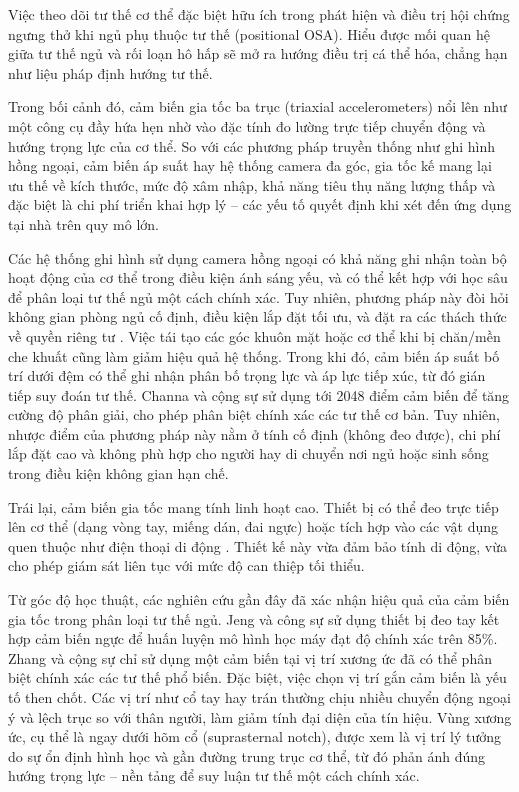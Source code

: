 Việc theo dõi tư thế cơ thể đặc biệt hữu ích trong phát hiện 
và điều trị hội chứng ngưng thở khi ngủ phụ thuộc tư thế (positional OSA).
Hiểu được mối quan hệ giữa tư thế ngủ và rối loạn hô hấp sẽ mở ra hướng điều trị cá thể hóa, 
chẳng hạn như liệu pháp định hướng tư thế. 

Trong bối cảnh đó, cảm biến gia tốc ba trục (triaxial accelerometers) 
nổi lên như một công cụ đầy hứa hẹn nhờ vào đặc tính đo lường trực tiếp 
chuyển động và hướng trọng lực của cơ thể. So với các phương pháp truyền 
thống như ghi hình hồng ngoại, cảm biến áp suất hay hệ thống camera 
đa góc, gia tốc kế mang lại ưu thế về kích thước, mức độ xâm nhập, 
khả năng tiêu thụ năng lượng thấp và đặc biệt là chi phí triển khai 
hợp lý – các yếu tố quyết định khi xét đến ứng dụng tại nhà trên 
quy mô lớn.

Các hệ thống ghi hình sử dụng camera hồng ngoại có khả năng ghi nhận toàn bộ hoạt động của 
cơ thể trong điều kiện ánh sáng yếu, và có thể kết hợp với học sâu để 
phân loại tư thế ngủ một cách chính xác. Tuy nhiên, phương pháp này 
đòi hỏi không gian phòng ngủ cố định, điều kiện lắp đặt tối ưu, 
và đặt ra các thách thức về quyền riêng tư \cite{Akbarian_osa}. 
Việc tái tạo các góc khuôn mặt hoặc cơ thể khi bị chăn/mền che 
khuất cũng làm giảm hiệu quả hệ thống.
Trong khi đó, cảm biến áp suất bố trí dưới đệm có thể ghi nhận phân bố 
trọng lực và áp lực tiếp xúc, từ đó gián tiếp suy đoán tư thế. 
Channa và cộng sự \cite{Channa_osa} sử dụng tới 2048 điểm cảm biến để 
tăng cường độ phân giải, cho phép phân biệt chính xác các tư thế cơ bản. 
Tuy nhiên, nhược điểm của phương pháp này nằm ở tính cố định 
(không đeo được), chi phí lắp đặt cao và không phù hợp cho người hay 
di chuyển nơi ngủ hoặc sinh sống trong điều kiện không gian hạn chế.

Trái lại, cảm biến gia tốc mang tính linh hoạt cao. 
Thiết bị có thể đeo trực tiếp lên cơ thể (dạng vòng tay, miếng dán, 
đai ngực) hoặc tích hợp vào các vật dụng quen thuộc như điện thoại 
di động \cite{sun2017sleepmonitor, Natale_osa}. 
Thiết kế này vừa đảm bảo tính di động, vừa cho phép giám sát liên tục 
với mức độ can thiệp tối thiểu.

Từ góc độ học thuật, các nghiên cứu gần đây đã xác nhận hiệu quả của 
cảm biến gia tốc trong phân loại tư thế ngủ. Jeng và công sự \cite{Jeng} 
sử dụng thiết bị đeo tay kết hợp cảm biến ngực để huấn luyện mô hình 
học máy đạt độ chính xác trên 85\%. Zhang và cộng sự \cite{Zhang_osa} 
chỉ sử dụng một cảm biến tại vị trí xương ức đã có thể phân biệt 
chính xác các tư thế phổ biến. Đặc biệt, việc chọn vị trí gắn cảm biến 
là yếu tố then chốt. Các vị trí như cổ tay hay trán thường chịu nhiều 
chuyển động ngoại ý và lệch trục so với thân người, làm giảm tính đại 
diện của tín hiệu. Vùng xương ức, cụ thể là ngay dưới hõm cổ 
(suprasternal notch), được xem là vị trí lý tưởng do sự ổn định 
hình học và gần đường trung trục cơ thể, từ đó phản ánh đúng hướng 
trọng lực – nền tảng để suy luận tư thế một cách chính xác.

